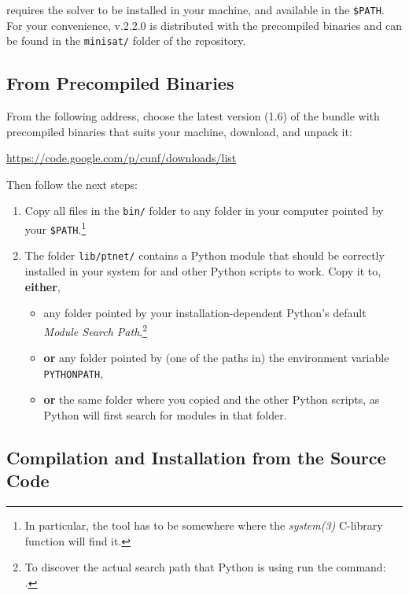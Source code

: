 \documentclass[a4paper]{refart}
\begin{document}
\cna requires the \minisat solver to be installed in your machine, and
available in the \verb!$PATH!.
For your convenience, \minisat v.2.2.0 is distributed with the precompiled
binaries and can be found in the \verb!minisat/! folder of the repository.

\subsection{From Precompiled Binaries}
\label{s:precompiled}

From the following address, choose the latest version (1.6) of the bundle
with precompiled binaries that suits your machine,
download, and unpack it:
\begin{center}
\url{https://code.google.com/p/cunf/downloads/list}
\end{center}
Then follow the next steps:
\begin{enumerate}
\item
  Copy all files in the \verb!bin/! folder to any folder in your
  computer pointed by your \verb!$PATH!.\footnote{In particular, the \minisat
  tool has to be somewhere where the \textit{system(3)} C-library function
  will find it.}
\item
  The folder \verb!lib/ptnet/! contains a Python module that should be
  correctly installed in your system for \cna and other Python scripts
  to work.
  Copy it to, \textbf{either},
  \begin{itemize}
  \item
    any folder pointed by your installation-dependent Python's default
    \textit{Module Search Path},\footnote{To discover the actual search
    path that Python is using run the command: \\
    .}
  \item
    \textbf{or} any folder pointed by (one of the paths in) the
    environment variable \verb!PYTHONPATH!,
  \item
    \textbf{or} the same folder where you copied \cna and the other Python
    scripts, as Python will first search for modules in that folder.
  \end{itemize}
\end{enumerate}

\subsection{Compilation and Installation from the Source Code}
\label{s:compilation}
\end{document}
